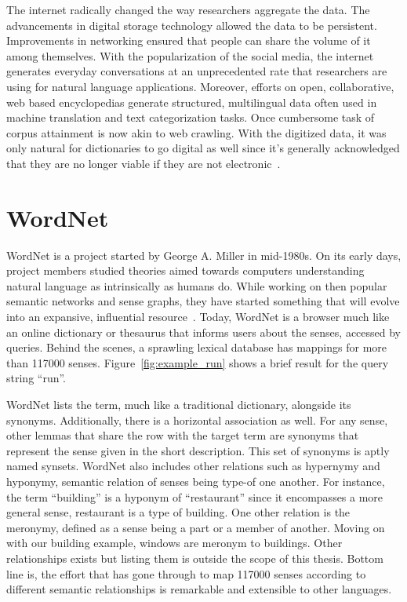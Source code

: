 The internet radically changed the way researchers aggregate the data.
The advancements in digital storage technology allowed the data to be persistent.
Improvements in networking ensured that people can share the volume of it among themselves.
With the popularization of the social media, the internet generates everyday conversations at an unprecedented rate that researchers are using for natural language applications. %
Moreover,  efforts on open, collaborative, web based encyclopedias generate structured, multilingual data often used in machine translation and text categorization tasks. %
Once cumbersome task of corpus attainment is now akin to web crawling.
With the digitized data, it was only natural for dictionaries to go digital as well since it's generally acknowledged that they are no longer viable if they are not electronic~\cite{sterkenburg_practical_2003}.

\section{WordNet}%
\label{sec:wordnet}
WordNet is a project started by George A\@. Miller in mid-1980s.
On its early days, project members studied theories aimed towards computers understanding natural language as intrinsically as humans do.
While working on then popular semantic networks and sense graphs, they have started something that will evolve into an expansive, influential resource~\cite{fellbaum_wordnet_1998}.
Today, WordNet is a browser much like an online dictionary or thesaurus that  informs users about the senses, accessed by queries.
Behind the scenes, a sprawling lexical database has mappings for more than 117000 senses.
Figure~\ref{fig:example_run} shows a brief result for the query string \enquote{run}.

WordNet lists the term, much like a traditional dictionary, alongside its synonyms.
Additionally, there is a horizontal association as well.
For any sense, other lemmas that share the row with the target term are synonyms that represent the sense given in the short description.
This set of synonyms is aptly named synsets.
WordNet also includes other relations such as hypernymy and hyponymy, semantic relation of senses being type-of one another.
For instance, the term \enquote{building} is a hyponym of \enquote{restaurant} since it encompasses a more general sense, restaurant is a type of building.
One other relation is the meronymy, defined as a sense being a part or a member of another.
Moving on with our building example, windows are meronym to buildings.
Other relationships exists but listing them is outside the scope of this thesis.
Bottom line is, the effort that has gone through to map 117000 senses according to different semantic relationships is remarkable and extensible to other languages.

